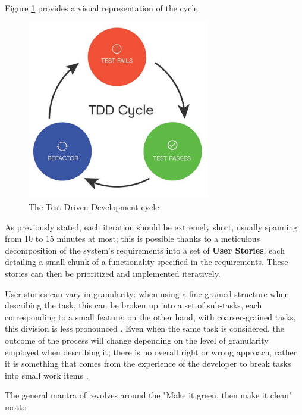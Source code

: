 Figure \ref{tdd-cycle} provides a visual representation of the \tdd cycle:
\begin{figure}[h]
    \centering
    \includegraphics[width=8cm, scale=0.2]{figures/tdd_cycle.jpg}
    \caption{The Test Driven Development cycle}
    \label{tdd-cycle}
\end{figure}

As previously stated, each \tdd iteration should be extremely short, usually spanning from 10 to 15 minutes at most; this is possible thanks to a meticulous decomposition of the system's requirements into a set of \textbf{User Stories}, each detailing a small chunk of a functionality specified in the requirements. These stories can then be prioritized and implemented iteratively.

User stories can vary in granularity: when using a fine-grained structure when describing the task, this can be broken up into a set of sub-tasks, each corresponding to a small feature; on the other hand, with coarser-grained tasks, this division is less pronounced \cite{DBLP:journals/tse/KaracTJ21}. Even when the same task is considered, the outcome of the \tdd process will change depending on the level of granularity employed when describing it; there is no overall right or wrong approach, rather it is something that comes from the experience of the developer to break tasks into small work items \cite{DBLP:journals/tse/KaracTJ21}.

The general mantra of \tdd revolves around the "Make it green, then make it clean" motto

